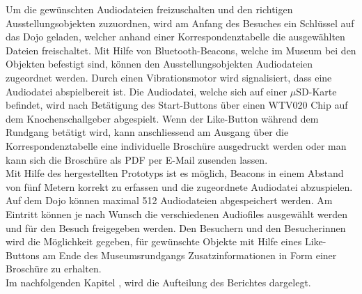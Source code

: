 Um die gewünschten Audiodateien freizuschalten und den richtigen Ausstellungsobjekten zuzuordnen, wird am Anfang des Besuches ein Schlüssel auf das Dojo geladen, welcher anhand einer Korrespondenztabelle die ausgewählten Dateien freischaltet. Mit Hilfe von Bluetooth-Beacons, welche im Museum bei den Objekten befestigt sind, können den Ausstellungsobjekten Audiodateien zugeordnet werden. Durch einen Vibrationsmotor wird signalisiert, dass eine Audiodatei abspielbereit ist. Die Audiodatei, welche sich auf einer $\mu$SD-Karte befindet, wird nach Betätigung des Start-Buttons über einen WTV020 Chip auf dem Knochenschallgeber abgespielt. Wenn der Like-Button während dem Rundgang betätigt wird, kann anschliessend am Ausgang über die Korrespondenztabelle eine individuelle Broschüre ausgedruckt werden oder man kann sich die Broschüre als PDF per E-Mail zusenden lassen.\\

Mit Hilfe des hergestellten Prototyps ist es möglich, Beacons in einem Abstand von fünf Metern korrekt zu erfassen und die zugeordnete Audiodatei abzuspielen. Auf dem Dojo können maximal 512 Audiodateien abgespeichert werden. Am Eintritt können je nach Wunsch die verschiedenen Audiofiles ausgewählt werden und für den Besuch freigegeben werden. Den Besuchern und den Besucherinnen wird die Möglichkeit gegeben, für gewünschte Objekte mit Hilfe eines Like-Buttons am Ende des Museumsrundgangs Zusatzinformationen in Form einer Broschüre zu erhalten.\\
 
Im nachfolgenden Kapitel , wird die Aufteilung des Berichtes dargelegt. 
